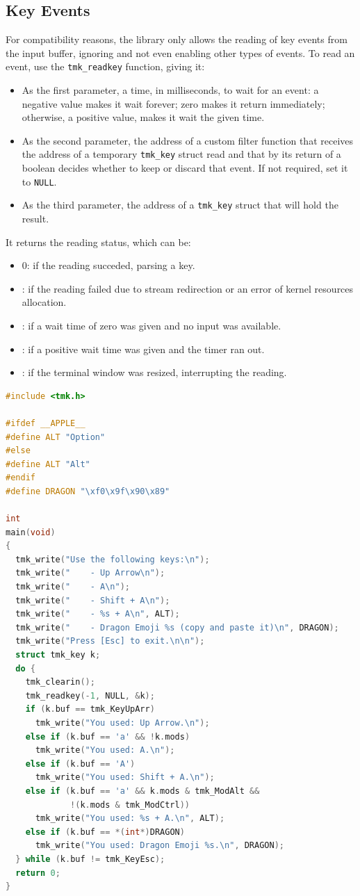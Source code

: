 \documentclass{report}
\begin{document}
\subsection{Key Events}
For compatibility reasons, the library only allows the reading of key events from the input buffer, ignoring and not even enabling other types of events. To read an event, use the \texttt{tmk\_readkey} function, giving it:
\begin{itemize}
  \item As the first parameter, a time, in milliseconds, to wait for an event: a negative value makes it wait forever; zero makes it return immediately; otherwise, a positive value, makes it wait the given time.
  \item As the second parameter, the address of a custom filter function that receives the address of a temporary \texttt{tmk\_key} struct read and that by its return of a boolean decides whether to keep or discard that event. If not required, set it to \texttt{NULL}.
  \item As the third parameter, the address of a \texttt{tmk\_key} struct that will hold the result.
\end{itemize}
It returns the reading status, which can be:
\begin{itemize}
  \item 0: if the reading succeded, parsing a key.
  \item {}: if the reading failed due to stream redirection or an error of kernel resources allocation.
  \item {}: if a wait time of zero was given and no input was available.
  \item {}: if a positive wait time was given and the timer ran out.
  \item {}: if the terminal window was resized, interrupting the reading.
\end{itemize}
\begin{lstlisting}[language=c,caption=an example that parse some keys.]
#include <tmk.h>

#ifdef __APPLE__
#define ALT "Option"
#else
#define ALT "Alt"
#endif
#define DRAGON "\xf0\x9f\x90\x89"

int
main(void)
{
  tmk_write("Use the following keys:\n");
  tmk_write("    - Up Arrow\n");
  tmk_write("    - A\n");
  tmk_write("    - Shift + A\n");
  tmk_write("    - %s + A\n", ALT);
  tmk_write("    - Dragon Emoji %s (copy and paste it)\n", DRAGON);
  tmk_write("Press [Esc] to exit.\n\n");
  struct tmk_key k;
  do {
    tmk_clearin();
    tmk_readkey(-1, NULL, &k);
    if (k.buf == tmk_KeyUpArr)
      tmk_write("You used: Up Arrow.\n");
    else if (k.buf == 'a' && !k.mods)
      tmk_write("You used: A.\n");
    else if (k.buf == 'A')
      tmk_write("You used: Shift + A.\n");
    else if (k.buf == 'a' && k.mods & tmk_ModAlt &&
             !(k.mods & tmk_ModCtrl))
      tmk_write("You used: %s + A.\n", ALT);
    else if (k.buf == *(int*)DRAGON)
      tmk_write("You used: Dragon Emoji %s.\n", DRAGON);
  } while (k.buf != tmk_KeyEsc);
  return 0;
}
\end{lstlisting}
\end{document}
